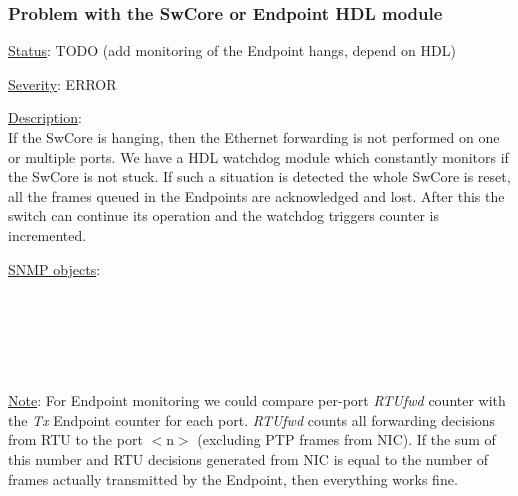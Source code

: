 \subsubsection{\bf Problem with the SwCore or Endpoint HDL module}
		\label{fail:data:swcore_hang}
		\begin{pck_descr}
		\item [] \underline{Status}: TODO (add monitoring of the Endpoint hangs, depend on
			HDL)
			\item [] \underline{Severity}: ERROR
			\item [] \underline{Description}:\\
				If the SwCore is hanging, then the Ethernet forwarding is not
				performed on one or multiple ports. We have a HDL watchdog module which
				constantly monitors if the SwCore is not stuck. If such a situation is
				detected the whole SwCore is reset, all the frames queued in the
				Endpoints are acknowledged and lost. After this the switch can continue
				its operation and the watchdog triggers counter is incremented.
			\item [] \underline{SNMP objects}:\\
				{\footnotesize
				\\
				\\
				\\
				\\
				\\
				 }
			\item [] \underline{Note}: For Endpoint monitoring we could compare
				per-port \emph{RTUfwd} counter with the \emph{Tx} Endpoint counter for
				each port. \emph{RTUfwd} counts all forwarding decisions from RTU to the
				port $<$n$>$ (excluding PTP frames from NIC). If the sum of this number
				and RTU decisions generated from NIC is equal to the number of frames
				actually transmitted by the Endpoint, then everything works fine.
		\end{pck_descr}

